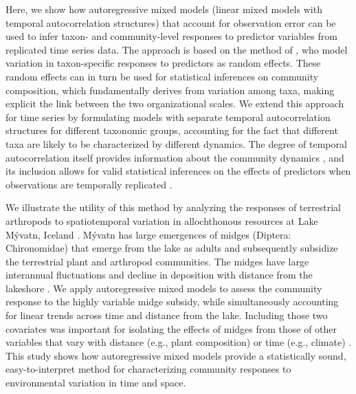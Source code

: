 Here, we show how autoregressive mixed models (linear mixed models with temporal
autocorrelation structures) that account for observation error
can be used to infer taxon- and community-level responses
to predictor variables from replicated time series data.
The approach is based on the method of \cite{Jackson2012}, who model variation in
taxon-specific responses to predictors as random effects.
These random effects can in turn be used for statistical inferences on community composition,
which fundamentally derives from variation among taxa,
making explicit the link between the two organizational scales.
We extend this approach for time series by formulating models with separate
temporal autocorrelation structures for different taxonomic groups, accounting for
the fact that different taxa are likely to be characterized by different dynamics.
The degree of temporal autocorrelation itself provides information 
about the community dynamics \citep{Ives2003},
and its inclusion allows for valid statistical inferences on the effects of predictors 
when observations are temporally replicated \citep{Ives2006}.

We illustrate the utility of this method by analyzing the responses of 
terrestrial arthropods to spatiotemporal variation in allochthonous resources at Lake Mývatn, Iceland \citep{Einarsson2004}.
Mývatn has large emergences of midges (Diptera: Chironomidae) that emerge from the lake as adults 
and subsequently subsidize the terrestrial
plant \citep{Gratton2008, Krowiak2017} and arthropod \citep{Dreyer2012, Sanchez2018} communities.
The midges have large interannual fluctuations and decline
in deposition with distance from the lakeshore \citep{Dreyer2015}.
We apply autoregressive mixed models to assess the community response to the
highly variable midge subsidy, 
while simultaneously accounting for linear trends across time and distance from the lake.
Including those two covariates was important for isolating the effects of midges from those
of other variables that vary with distance (e.g., plant composition) or 
time (e.g., climate) \citep{Bowden2018}.
This study shows how autoregressive mixed models provide a statistically sound, 
easy-to-interpret method for characterizing community responses to
environmental variation in time and space.


